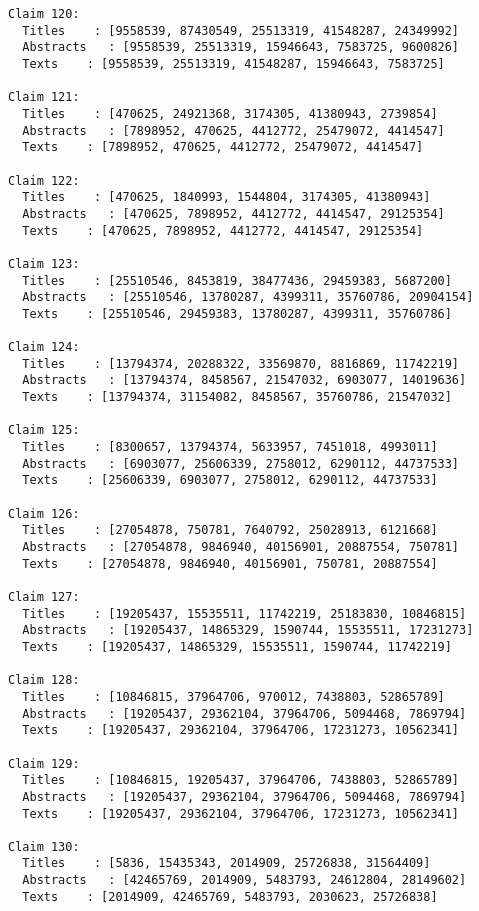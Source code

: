 \documentclass[11pt]{article}
\begin{document}
\begin{Verbatim}[commandchars=\\\{\}]
Claim 120:
  Titles    : [9558539, 87430549, 25513319, 41548287, 24349992]
  Abstracts   : [9558539, 25513319, 15946643, 7583725, 9600826]
  Texts    : [9558539, 25513319, 41548287, 15946643, 7583725]

Claim 121:
  Titles    : [470625, 24921368, 3174305, 41380943, 2739854]
  Abstracts   : [7898952, 470625, 4412772, 25479072, 4414547]
  Texts    : [7898952, 470625, 4412772, 25479072, 4414547]

Claim 122:
  Titles    : [470625, 1840993, 1544804, 3174305, 41380943]
  Abstracts   : [470625, 7898952, 4412772, 4414547, 29125354]
  Texts    : [470625, 7898952, 4412772, 4414547, 29125354]

Claim 123:
  Titles    : [25510546, 8453819, 38477436, 29459383, 5687200]
  Abstracts   : [25510546, 13780287, 4399311, 35760786, 20904154]
  Texts    : [25510546, 29459383, 13780287, 4399311, 35760786]

Claim 124:
  Titles    : [13794374, 20288322, 33569870, 8816869, 11742219]
  Abstracts   : [13794374, 8458567, 21547032, 6903077, 14019636]
  Texts    : [13794374, 31154082, 8458567, 35760786, 21547032]

Claim 125:
  Titles    : [8300657, 13794374, 5633957, 7451018, 4993011]
  Abstracts   : [6903077, 25606339, 2758012, 6290112, 44737533]
  Texts    : [25606339, 6903077, 2758012, 6290112, 44737533]

Claim 126:
  Titles    : [27054878, 750781, 7640792, 25028913, 6121668]
  Abstracts   : [27054878, 9846940, 40156901, 20887554, 750781]
  Texts    : [27054878, 9846940, 40156901, 750781, 20887554]

Claim 127:
  Titles    : [19205437, 15535511, 11742219, 25183830, 10846815]
  Abstracts   : [19205437, 14865329, 1590744, 15535511, 17231273]
  Texts    : [19205437, 14865329, 15535511, 1590744, 11742219]

Claim 128:
  Titles    : [10846815, 37964706, 970012, 7438803, 52865789]
  Abstracts   : [19205437, 29362104, 37964706, 5094468, 7869794]
  Texts    : [19205437, 29362104, 37964706, 17231273, 10562341]

Claim 129:
  Titles    : [10846815, 19205437, 37964706, 7438803, 52865789]
  Abstracts   : [19205437, 29362104, 37964706, 5094468, 7869794]
  Texts    : [19205437, 29362104, 37964706, 17231273, 10562341]

Claim 130:
  Titles    : [5836, 15435343, 2014909, 25726838, 31564409]
  Abstracts   : [42465769, 2014909, 5483793, 24612804, 28149602]
  Texts    : [2014909, 42465769, 5483793, 2030623, 25726838]


\end{Verbatim}
\end{document}
